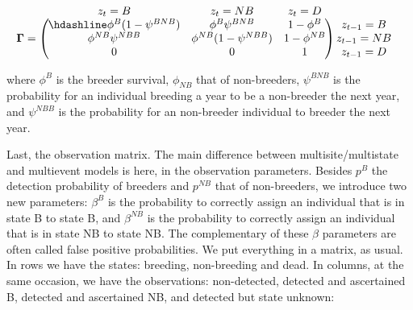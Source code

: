 \documentclass[
  12pt,
]{krantz}
\begin{document}
\[\begin{matrix}
& \\
\mathbf{\Gamma} =
    \left ( \vphantom{ \begin{matrix} 12 \\ 12 \\ 12 \end{matrix} } \right .
\end{matrix}
\hspace{-1.2em}
\begin{matrix}
    z_t=B & z_t=NB & z_t=D \\ \hdashline
\phi^B (1-\psi^{BNB}) & \phi^B \psi^{BNB} & 1 - \phi^B\\
\phi^{NB} \psi^{NBB} & \phi^{NB} (1-\psi^{NBB}) & 1 - \phi^{NB}\\
0 & 0 & 1
\end{matrix}
\hspace{-0.2em}
\begin{matrix}
& \\
\left . \vphantom{ \begin{matrix} 12 \\ 12 \\ 12 \end{matrix} } \right )
    \begin{matrix}
    z_{t-1}=B \\ z_{t-1}=NB \\ z_{t-1}=D
    \end{matrix}
\end{matrix}\]

where \(\phi^B\) is the breeder survival, \(\phi_ {NB}\) that of non-breeders, \(\psi^{BNB}\) is the probability for an individual breeding a year to be a non-breeder the next year, and \(\psi^{NBB}\) is the probability for an non-breeder individual to breeder the next year.

Last, the observation matrix. The main difference between multisite/multistate and multievent models is here, in the observation parameters. Besides \(p^B\) the detection probability of breeders and \(p^{NB}\) that of non-breeders, we introduce two new parameters: \(\beta^B\) is the probability to correctly assign an individual that is in state B to state B, and \(\beta^{NB}\) is the probability to correctly assign an individual that is in state NB to state NB. The complementary of these \(\beta\) parameters are often called false positive probabilities. We put everything in a matrix, as usual. In rows we have the states: breeding, non-breeding and dead. In columns, at the same occasion, we have the observations: non-detected, detected and ascertained B, detected and ascertained NB, and detected but state unknown:
\end{document}
